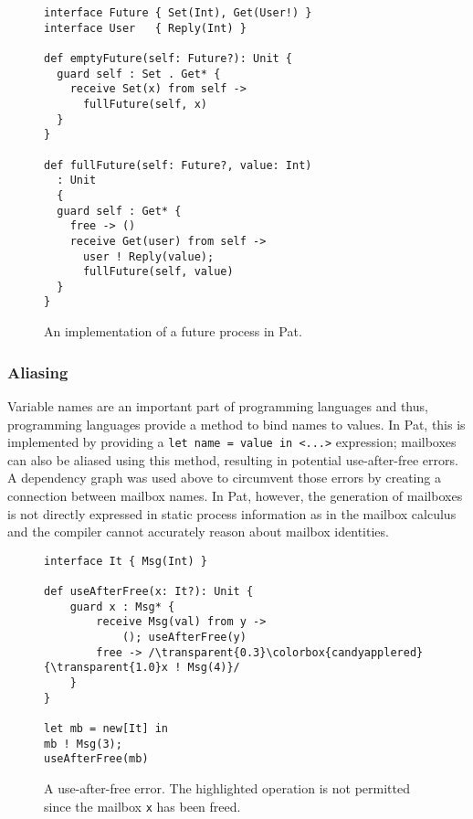 \begin{wrapfigure}{r}{0.5\textwidth}
\vspace{-20pt} %
\begin{lstlisting}
interface Future { Set(Int), Get(User!) }
interface User   { Reply(Int) }

def emptyFuture(self: Future?): Unit {
  guard self : Set . Get* {
    receive Set(x) from self ->
      fullFuture(self, x)
  }
}

def fullFuture(self: Future?, value: Int)
  : Unit
  {
  guard self : Get* {
    free -> ()
    receive Get(user) from self ->
      user ! Reply(value);
      fullFuture(self, value)
  }
}
\end{lstlisting}
\caption{An implementation of a future process in Pat.\cite{fowlerPatCheckerGithub2025}}
\label{lst:futurePat}
\vspace{-20pt} %


\end{wrapfigure}

\subsubsection{Aliasing}

Variable names are an important part of programming languages and thus, programming languages provide a method to bind names to values. In Pat, this is implemented by providing a \lstinline|let name = value in <...>| expression; mailboxes can also be aliased using this method, resulting in potential use-after-free errors. A dependency graph was used above to circumvent those errors by creating a connection between mailbox names. In Pat, however, the generation of mailboxes is not directly expressed in static process information as in the mailbox calculus and the compiler cannot accurately reason about mailbox identities.

\begin{wrapfigure}{l}{0.4\textwidth}
\begin{lstlisting}[escapechar=/]
interface It { Msg(Int) }

def useAfterFree(x: It?): Unit {
    guard x : Msg* {
        receive Msg(val) from y ->
            (); useAfterFree(y)
        free -> /\transparent{0.3}\colorbox{candyapplered}{\transparent{1.0}x ! Msg(4)}/
    }
}

let mb = new[It] in
mb ! Msg(3);
useAfterFree(mb)
\end{lstlisting}
\caption{A use-after-free error. The highlighted operation is not permitted since the mailbox \lstinline|x| has been freed.\cite{fowlerSpecialDeliveryProgramming2023}}
\label{lst:patUseAfterFree}
\vspace{-00pt}
\end{wrapfigure}


